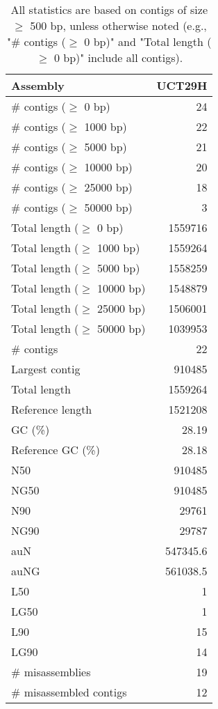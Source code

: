 \documentclass[12pt,a4paper]{article}
\begin{document}
\begin{table}[ht]
\begin{center}
\caption{All statistics are based on contigs of size $\geq$ 500 bp, unless otherwise noted (e.g., "\# contigs ($\geq$ 0 bp)" and "Total length ($\geq$ 0 bp)" include all contigs).}
\begin{tabular}{|l*{1}{|r}|}
\hline
Assembly & UCT29H \\ \hline
\# contigs ($\geq$ 0 bp) & 24 \\ \hline
\# contigs ($\geq$ 1000 bp) & 22 \\ \hline
\# contigs ($\geq$ 5000 bp) & 21 \\ \hline
\# contigs ($\geq$ 10000 bp) & 20 \\ \hline
\# contigs ($\geq$ 25000 bp) & 18 \\ \hline
\# contigs ($\geq$ 50000 bp) & 3 \\ \hline
Total length ($\geq$ 0 bp) & 1559716 \\ \hline
Total length ($\geq$ 1000 bp) & 1559264 \\ \hline
Total length ($\geq$ 5000 bp) & 1558259 \\ \hline
Total length ($\geq$ 10000 bp) & 1548879 \\ \hline
Total length ($\geq$ 25000 bp) & 1506001 \\ \hline
Total length ($\geq$ 50000 bp) & 1039953 \\ \hline
\# contigs & 22 \\ \hline
Largest contig & 910485 \\ \hline
Total length & 1559264 \\ \hline
Reference length & 1521208 \\ \hline
GC (\%) & 28.19 \\ \hline
Reference GC (\%) & 28.18 \\ \hline
N50 & 910485 \\ \hline
NG50 & 910485 \\ \hline
N90 & 29761 \\ \hline
NG90 & 29787 \\ \hline
auN & 547345.6 \\ \hline
auNG & 561038.5 \\ \hline
L50 & 1 \\ \hline
LG50 & 1 \\ \hline
L90 & 15 \\ \hline
LG90 & 14 \\ \hline
\# misassemblies & 19 \\ \hline
\# misassembled contigs & 12 \\ \hline

\end{tabular}
\end{center}
\end{table}
\end{document}
